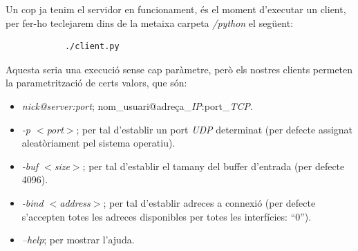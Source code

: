 \documentclass[a4paper,10pt]{article}
\begin{document}
		Un cop ja tenim el servidor en funcionament, és el moment d'executar un client, per fer-ho teclejarem dins de la metaixa carpeta \emph{/python} el següent:
			\begin{verbatim}
			./client.py 
			\end{verbatim}
		Aquesta seria una execució sense cap paràmetre, però els nostres clients permeten la parametrització de certs valors, que són:
			\begin{itemize}
			\item \emph{nick@server:port}; nom\_usuari@adreça\_\emph{IP}:port\_\emph{TCP}.
			\item \emph{-p $<$port$>$}; per tal d'establir un port \emph{UDP} determinat (per defecte assignat aleatòriament pel sistema operatiu).
			\item \emph{-buf $<$size$>$}; per tal d'establir el tamany del buffer d'entrada (per defecte 4096).
			\item \emph{-bind $<$address$>$}; per tal d'establir adreces a connexió (per defecte s'accepten totes les adreces disponibles per totes les interfícies: ``0'').
			\item \emph{--help}; per mostrar l'ajuda.
			\end{itemize}
\end{document}
